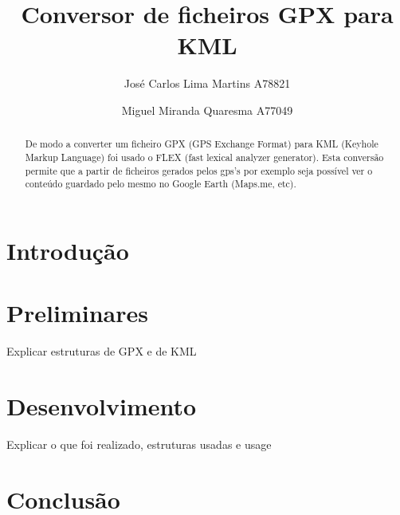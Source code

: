 \documentclass{llncs}
\begin{document}
 \mainmatter
\title{Conversor de ficheiros GPX para KML}
\author{José Carlos Lima Martins A78821 \and
        Miguel Miranda Quaresma A77049}

\maketitle

\justify

\begin{abstract}
De modo a converter um ficheiro GPX (GPS Exchange Format) para KML (Keyhole Markup Language) foi usado o FLEX (fast lexical analyzer generator). Esta conversão permite que a partir de ficheiros gerados pelos gps's por exemplo seja possível ver o conteúdo guardado pelo mesmo no Google Earth (Maps.me, etc).
\end{abstract}

\section{Introdução}

\section{Preliminares}
Explicar estruturas de GPX e de KML

\section{Desenvolvimento}
Explicar o que foi realizado, estruturas usadas e usage

\section{Conclusão}
\end{document}
